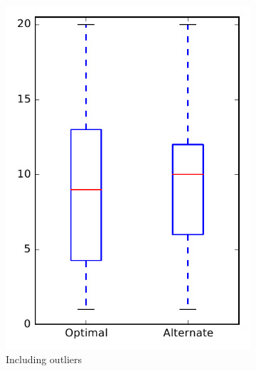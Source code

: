 
\begin{figure}
    \centering
    \begin{subfigure}{.4\textwidth}
        \centering
        \includegraphics[height=0.4\textheight]{figures/combo/dit_rq1_pig}
        \caption{Including outliers}\label{fig:combo:dit:rq1:pig_outlier}
    \end{subfigure}%
    \begin{subfigure}{.4\textwidth}
        \centering

\end{subfigure}
\end{figure}
